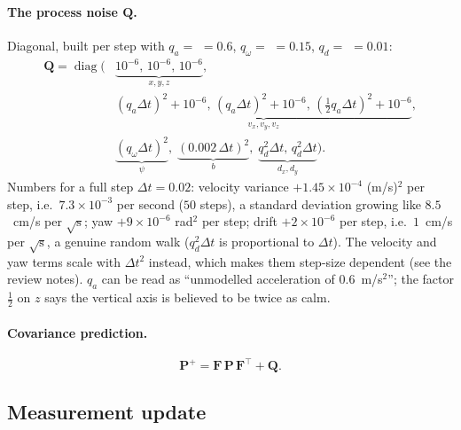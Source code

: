 \paragraph{The process noise $\mathbf Q$.} Diagonal, built per step with $q_a = $  $=0.6$,
$q_\omega = $  $=0.15$, $q_d = $  $=0.01$:
\begin{equation}
\begin{aligned}
\mathbf Q = \operatorname{diag}\Big(&
\underbrace{10^{-6},\,10^{-6},\,10^{-6}}_{x,y,z},\\
&\underbrace{(q_a\Delta t)^2{+}10^{-6},\,(q_a\Delta t)^2{+}10^{-6},\,(\tfrac12 q_a\Delta t)^2{+}10^{-6}}_{v_x,v_y,v_z},\\
&\underbrace{(q_\omega\Delta t)^2}_{\psi},\;
\underbrace{(0.002\,\Delta t)^2}_{b},\;
\underbrace{q_d^2\Delta t,\,q_d^2\Delta t}_{d_x,d_y}\Big).
\end{aligned}
\end{equation}
Numbers for a full step $\Delta t=0.02$: velocity variance $+1.45\times10^{-4}$ (m/s)$^2$ per step, i.e.\ $7.3\times10^{-3}$ per
second ($50$ steps), a standard deviation growing like $8.5$~cm/s per $\sqrt{\text{s}}$; yaw $+9\times10^{-6}$ rad$^2$ per
step; drift $+2\times10^{-6}$ per step, i.e.\ $1$~cm/s per $\sqrt{\text{s}}$, a genuine random walk ($q_d^2\Delta t$ is
proportional to $\Delta t$). The velocity and yaw terms scale with $\Delta t^2$ instead, which makes them step-size
dependent (see the review notes). $q_a$ can be read as ``unmodelled acceleration of $0.6$~m/s$^2$''; the factor
$\frac12$ on $z$ says the vertical axis is believed to be twice as calm.

\paragraph{Covariance prediction.}
\begin{equation}
  \mathbf P^+ = \mathbf F\,\mathbf P\,\mathbf F^\top + \mathbf Q .
\end{equation}

\subsection{Measurement update}

